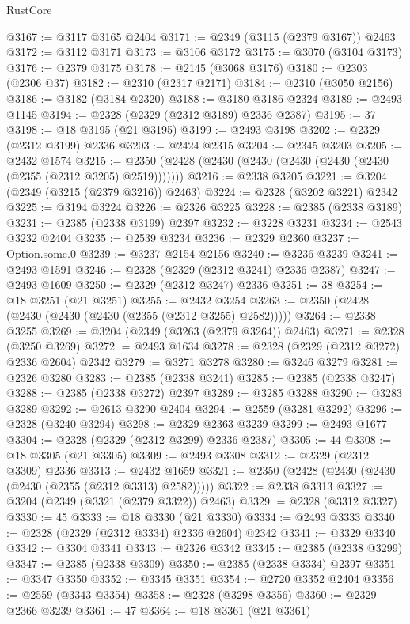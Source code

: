 \begin{lexlean}{RustCore}
\begin{coremodule}
@3167 := @3117 @3165 @2404
@3171 := @2349 (@3115 (@2379 @3167)) @2463
@3172 := @3112 @3171
@3173 := @3106 @3172
@3175 := @3070 (@3104 @3173)
@3176 := @2379 @3175
@3178 := @2145 (@3068 @3176)
@3180 := @2303 (@2306 @37)
@3182 := @2310 (@2317 @2171)
@3184 := @2310 (@3050 @2156)
@3186 := @3182 (@3184 @2320)
@3188 := @3180 @3186 @2324
@3189 := @2493 @1145
@3194 := @2328 (@2329 (@2312 @3189) @2336 @2387)
@3195 := 37
@3198 := @18 @3195 (@21 @3195)
@3199 := @2493 @3198
@3202 := @2329 (@2312 @3199) @2336
@3203 := @2424 @2315
@3204 := @2345 @3203
@3205 := @2432 @1574
@3215 := @2350 (@2428 (@2430 (@2430 (@2430 (@2430 (@2430 (@2355 (@2312 @3205) @2519)))))))
@3216 := @2338 @3205
@3221 := @3204 (@2349 (@3215 (@2379 @3216)) @2463)
@3224 := @2328 (@3202 @3221) @2342
@3225 := @3194 @3224
@3226 := @2326 @3225
@3228 := @2385 (@2338 @3189)
@3231 := @2385 (@2338 @3199) @2397
@3232 := @3228 @3231
@3234 := @2543 @3232 @2404
@3235 := @2539 @3234
@3236 := @2329 @2360
@3237 := Option.some.{0}
@3239 := @3237 @2154 @2156
@3240 := @3236 @3239
@3241 := @2493 @1591
@3246 := @2328 (@2329 (@2312 @3241) @2336 @2387)
@3247 := @2493 @1609
@3250 := @2329 (@2312 @3247) @2336
@3251 := 38
@3254 := @18 @3251 (@21 @3251)
@3255 := @2432 @3254
@3263 := @2350 (@2428 (@2430 (@2430 (@2430 (@2355 (@2312 @3255) @2582)))))
@3264 := @2338 @3255
@3269 := @3204 (@2349 (@3263 (@2379 @3264)) @2463)
@3271 := @2328 (@3250 @3269)
@3272 := @2493 @1634
@3278 := @2328 (@2329 (@2312 @3272) @2336 @2604) @2342
@3279 := @3271 @3278
@3280 := @3246 @3279
@3281 := @2326 @3280
@3283 := @2385 (@2338 @3241)
@3285 := @2385 (@2338 @3247)
@3288 := @2385 (@2338 @3272) @2397
@3289 := @3285 @3288
@3290 := @3283 @3289
@3292 := @2613 @3290 @2404
@3294 := @2559 (@3281 @3292)
@3296 := @2328 (@3240 @3294)
@3298 := @2329 @2363 @3239
@3299 := @2493 @1677
@3304 := @2328 (@2329 (@2312 @3299) @2336 @2387)
@3305 := 44
@3308 := @18 @3305 (@21 @3305)
@3309 := @2493 @3308
@3312 := @2329 (@2312 @3309) @2336
@3313 := @2432 @1659
@3321 := @2350 (@2428 (@2430 (@2430 (@2430 (@2355 (@2312 @3313) @2582)))))
@3322 := @2338 @3313
@3327 := @3204 (@2349 (@3321 (@2379 @3322)) @2463)
@3329 := @2328 (@3312 @3327)
@3330 := 45
@3333 := @18 @3330 (@21 @3330)
@3334 := @2493 @3333
@3340 := @2328 (@2329 (@2312 @3334) @2336 @2604) @2342
@3341 := @3329 @3340
@3342 := @3304 @3341
@3343 := @2326 @3342
@3345 := @2385 (@2338 @3299)
@3347 := @2385 (@2338 @3309)
@3350 := @2385 (@2338 @3334) @2397
@3351 := @3347 @3350
@3352 := @3345 @3351
@3354 := @2720 @3352 @2404
@3356 := @2559 (@3343 @3354)
@3358 := @2328 (@3298 @3356)
@3360 := @2329 @2366 @3239
@3361 := 47
@3364 := @18 @3361 (@21 @3361)

\end{coremodule}
\end{lexlean}
